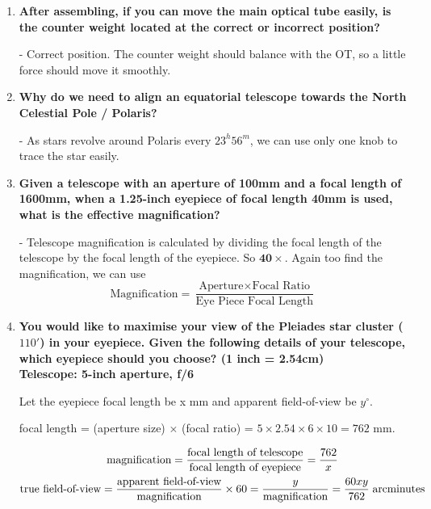 \documentclass[a4paper,12pt]{extarticle}
\begin{document}
\begin{enumerate}
	\item  \textbf{After assembling, if you can move the main optical tube easily, is the counter weight located at the correct or incorrect position? }
	\begin{sol}
		- Correct position. The counter weight should balance with the OT, so a little force should move it smoothly. 
	\end{sol}
	\item \textbf{Why do we need to align an equatorial telescope towards the North Celestial Pole / Polaris?}
	\begin{sol}
	- As stars revolve around Polaris every $23^h56^m$, we can use only one knob to trace the star easily.		
	\end{sol}
	
	\item \textbf{Given a telescope with an aperture of 100mm and a focal length of 1600mm, when a 1.25-inch eyepiece
	of focal length 40mm is used, what is the effective magnification?}
\begin{sol}
- Telescope magnification is calculated by dividing the focal length of the telescope by the focal
length of the eyepiece. So $\mathbf{40\times}$. Again too find the magnification, we can use
\[\text{Magnification}=\frac{\text{Aperture}\times \text{Focal Ratio}}{\text{Eye Piece Focal Length}}\]
\end{sol}

\item \textbf{You would like to maximise your view of the Pleiades star cluster ($110'$) in your eyepiece. Given the following details of your telescope, which eyepiece should you choose? (1 inch = 2.54cm)}\\
\textbf{Telescope: 5-inch aperture, f/6}\\

\begin{sol}
Let the eyepiece focal length be x mm and apparent field-of-view be $y^\circ$.
	
focal length = (aperture size) $\times$ (focal ratio) = $5 \times 2.54 \times 6 \times 10 = 762$ mm.

\begin{gather*}
	\text{magnification}=\frac{\text{focal length of telescope}}{\text{focal length of eyepiece}}=\frac{762}{x}\\
	\text{true field-of-view}=\frac{\text{apparent field-of-view}}{\text{magnification}}\times 60= \frac{y}{\text{magnification}}=\frac{60xy}{762}\; \rm arcminutes
\end{gather*}


\end{sol}
\end{enumerate}
\end{document}
